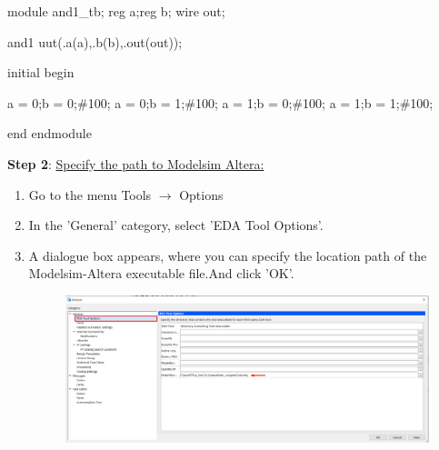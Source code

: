 \documentclass[12pt,singleside,a4paper]{article}
\begin{document}
\noindent module and1\_tb;\newline
reg a;reg b;\newline
wire out;\newline

\noindent and1 uut(.a(a),.b(b),.out(out));\newline

\noindent initial begin\newline

	a = 0;b = 0;\#100;\newline
\hspace*{14pt}	a = 0;b = 1;\#100;\newline
\hspace*{14pt}	a = 1;b = 0;\#100;\newline
\hspace*{14pt}	a = 1;b = 1;\#100;\newline
	
\noindent end \newline
\noindent endmodule


\noindent \textbf{Step 2}: \underline {Specify the path to Modelsim Altera:}
\begin{enumerate}
    \item Go to the menu Tools $\rightarrow$ Options
    \item In the 'General' category, select 'EDA Tool Options'.
    \item A dialogue box appears, where you can specify the location path of the Modelsim-Altera   \hspace*{5pt} executable file.And click 'OK'.
            \begin{figure}[H]
                \centering
                \includegraphics[scale=0.8]{nativelink/nativelink_1.png}
            \end{figure}
          
\end{enumerate}
\vspace{5mm}
\end{document}
